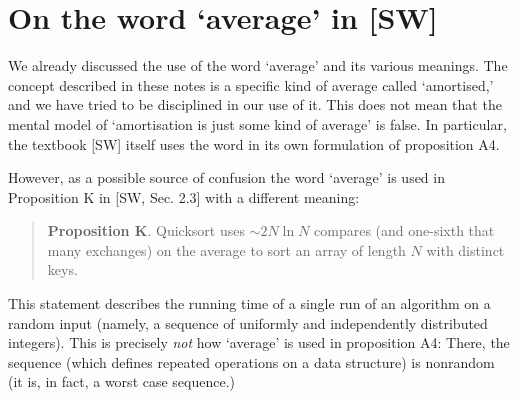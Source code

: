 \documentclass{tufte-handout}
\begin{document}
\section{On the word `average' in [SW]}

We already discussed the use of the word `average' and its various meanings.
The concept described in these notes is a specific kind of average called `amortised,' and we have tried to be disciplined in our use of it.
This does not mean that the mental model of `amortisation is just some kind of average' is false.
In particular, the textbook [SW] itself uses the word in its own formulation of proposition A4.

However, as a possible source of confusion the word `average' is used in Proposition K in [SW, Sec. 2.3] with a different meaning:
\begin{quote}
  {\bf Proposition K}. Quicksort uses $\sim 2N\ln N$ compares (and one-sixth that many exchanges) on the average to sort an array of length $N$ with distinct keys.
\end{quote}
This statement describes the running time of a single run of an algorithm on a random input (namely, a sequence of uniformly and independently distributed integers).
This is precisely \emph{not} how `average' is used in proposition A4:
There, the sequence (which defines repeated operations on a data structure) is nonrandom (it is, in fact, a worst case sequence.)
\end{document}
